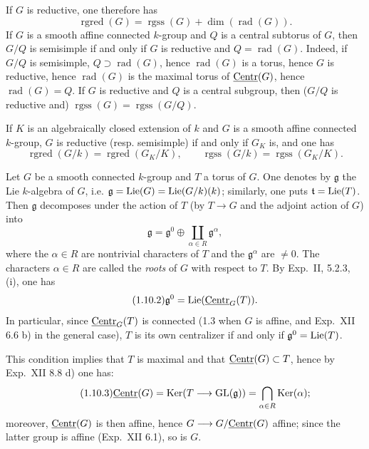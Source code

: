 If $G$ is reductive, one therefore has
\[
\operatorname{rgred}(G)=\operatorname{rgss}(G)+\dim(\operatorname{rad}(G)).
\]
If $G$ is a smooth affine connected $k$-group and $Q$ is a central subtorus of $G$, then $G/Q$ is semisimple if and only if $G$ is reductive and $Q=\operatorname{rad}(G)$. Indeed, if $G/Q$ is semisimple, $Q\supset\operatorname{rad}(G)$, hence $\operatorname{rad}(G)$ is a torus, hence $G$ is reductive, hence $\operatorname{rad}(G)$ is the maximal torus of $\underline{\mathrm{Centr}}(G)$, hence $\operatorname{rad}(G)=Q$. If $G$ is reductive and $Q$ is a central subgroup, then ($G/Q$ is reductive and) $\operatorname{rgss}(G)=\operatorname{rgss}(G/Q)$.

 If $K$ is an algebraically closed extension of $k$ and $G$ is a smooth affine connected $k$-group, $G$ is reductive (resp. semisimple) if and only if $G_K$ is, and one has
\[
\operatorname{rgred}(G/k)=\operatorname{rgred}(G_K/K),\qquad
\operatorname{rgss}(G/k)=\operatorname{rgss}(G_K/K).
\]

 Let $G$ be a smooth connected $k$-group and $T$ a torus of $G$.{\renewcommand{\thefootnote}{(9)}} One denotes by $\mathfrak g$ the Lie $k$-algebra of $G$, i.e. $\mathfrak g=\operatorname{Lie}(G)=\operatorname{Lie}(G/k)(k)$; similarly, one puts $\mathfrak t=\operatorname{Lie}(T)$. Then $\mathfrak g$ decomposes under the action of $T$ (by $T\to G$ and the adjoint action of $G$) into
\begin{equation}\tag{1.10.1}\label{XIX.eq.1.10.1}
\mathfrak g=\mathfrak g^0\oplus\coprod_{\alpha\in R}\mathfrak g^\alpha,
\end{equation}
where the $\alpha\in R$ are nontrivial characters of $T$ and the $\mathfrak g^\alpha$ are $\ne0$. The characters $\alpha\in R$ are called the \emph{roots} of $G$ with respect to $T$. By Exp.~II, 5.2.3, (i), one has
\begin{equation}\tag{1.10.2}\label{XIX.eq.1.10.2}
\mathfrak g^0=\operatorname{Lie}(\underline{\mathrm{Centr}}_G(T)).
\end{equation}
In particular,{\renewcommand{\thefootnote}{(10)}} since $\underline{\mathrm{Centr}}_G(T)$ is connected (1.3 when $G$ is affine, and Exp.~XII 6.6 b) in the general case), $T$ is its own centralizer if and only if $\mathfrak g^0=\operatorname{Lie}(T)$.

This condition implies that $T$ is maximal and that $\underline{\mathrm{Centr}}(G)\subset T$, hence by Exp.~XII 8.8 d) one has:
\begin{equation}\tag{1.10.3}\label{XIX.eq.1.10.3}
\underline{\mathrm{Centr}}(G)=\operatorname{Ker}(T\longrightarrow\operatorname{GL}(\mathfrak g))=\bigcap_{\alpha\in R}\operatorname{Ker}(\alpha);
\end{equation}
moreover, $\underline{\mathrm{Centr}}(G)$ is then affine, hence $G\longrightarrow G/\underline{\mathrm{Centr}}(G)$ affine; since the latter group is affine (Exp.~XII 6.1),{\renewcommand{\thefootnote}{(11)}} so is $G$.

